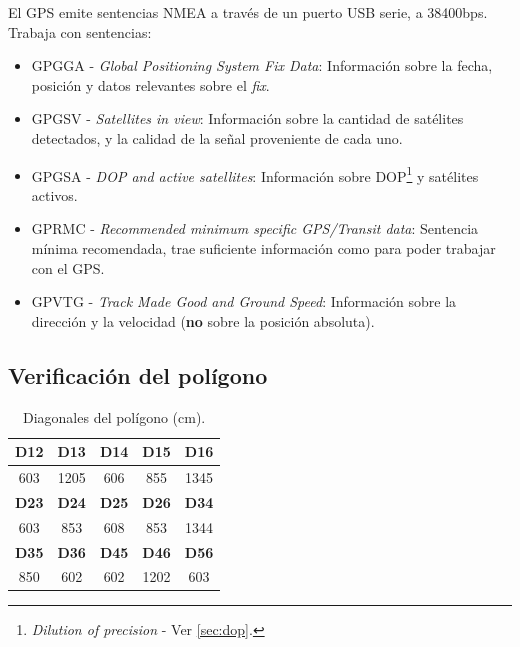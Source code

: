 \documentclass[main]{subfiles}
\begin{document}
El GPS emite sentencias NMEA a través de un puerto USB serie, a 38400bps. Trabaja con sentencias:
\begin{itemize}
\item GPGGA - \textit{Global Positioning System Fix Data}: Información sobre la fecha, posición y datos relevantes sobre el \textit{fix}.
\item GPGSV - \textit{Satellites in view}: Información sobre la cantidad de satélites detectados, y la calidad de la se\~nal proveniente de cada uno.
\item GPGSA - \textit{DOP and active satellites}: Información sobre DOP\footnote{\textit{Dilution of precision} - Ver \ref{sec:dop}.} y satélites activos.
\item GPRMC - \textit{Recommended minimum specific GPS/Transit data}: Sentencia mínima recomendada, trae suficiente información como para poder trabajar con el GPS.
\item GPVTG - \textit{Track Made Good and Ground Speed}: Información sobre la dirección y la velocidad (\textbf{no} sobre la posición absoluta).
\end{itemize}

\subsection{Verificación del polígono}
\label{sec:verificacion-del-poligono}

\begin{table}
\centering
\vspace{-25pt}
\caption{Diagonales del polígono (cm).}\label{tab:diagonales-poligono}
\begin{tabular}{|c|c|c|c|c|}
\hline
\rowcolor[gray]{0.9}
\textbf{D12} & \textbf{D13} & \textbf{D14} & \textbf{D15} & \textbf{D16} \\
\hline
603 & 1205 & 606 & 855 & 1345 \\
\hline
\rowcolor[gray]{0.9}
\textbf{D23} & \textbf{D24} & \textbf{D25} & \textbf{D26} & \textbf{D34} \\
\hline
603 & 853 & 608 & 853 & 1344\\
\hline
\rowcolor[gray]{0.9}
\textbf{D35} & \textbf{D36} & \textbf{D45} & \textbf{D46} & \textbf{D56} \\
\hline
850 & 602 & 602 & 1202 & 603 \\
\hline
\end{tabular}
\vspace{-30pt}
\end{table}
\end{document}
